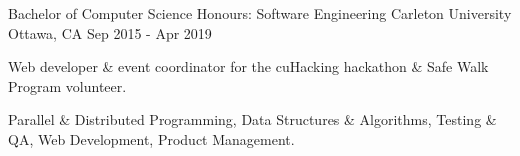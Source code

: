 
\begin{cventries}
	\cventry
		{Bachelor of Computer Science Honours: Software Engineering}
		{Carleton University}
		{Ottawa, CA}
		{Sep 2015 - Apr 2019}
		{\begin{cvitems}
			\item Web developer \& event coordinator for the cuHacking hackathon \& Safe Walk Program volunteer.
			\item Parallel \& Distributed Programming, Data Structures \& Algorithms, Testing \& QA, Web Development, Product Management.
		\end{cvitems}}
\end{cventries}
